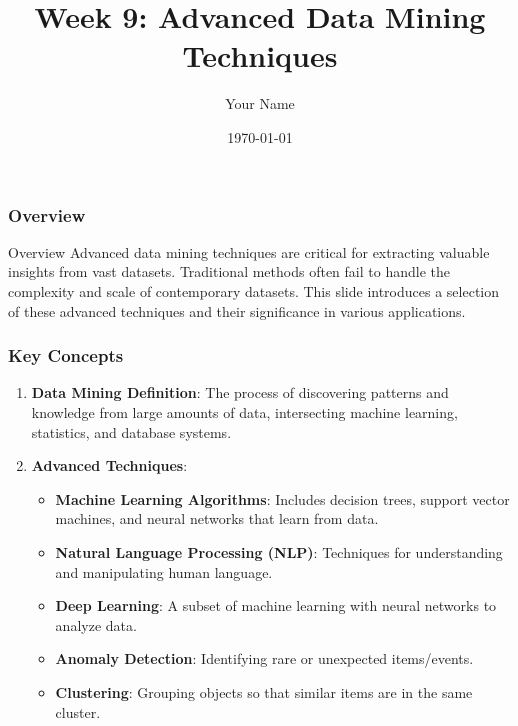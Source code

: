 \documentclass{beamer}
\title{Week 9: Advanced Data Mining Techniques}
\author{Your Name}
\institute{Your Institution}
\date{\today}
\begin{document}
\frame{\titlepage}

\begin{frame}[fragile]
    \titlepage
\end{frame}

\begin{frame}[fragile]
    \frametitle{Overview}
    \begin{block}{Overview}
        Advanced data mining techniques are critical for extracting valuable insights from vast datasets. Traditional methods often fail to handle the complexity and scale of contemporary datasets. This slide introduces a selection of these advanced techniques and their significance in various applications.
    \end{block}
\end{frame}

\begin{frame}[fragile]
    \frametitle{Key Concepts}
    \begin{enumerate}
        \item \textbf{Data Mining Definition}: The process of discovering patterns and knowledge from large amounts of data, intersecting machine learning, statistics, and database systems.
        
        \item \textbf{Advanced Techniques}:
        \begin{itemize}
            \item \textbf{Machine Learning Algorithms}: Includes decision trees, support vector machines, and neural networks that learn from data.
            \item \textbf{Natural Language Processing (NLP)}: Techniques for understanding and manipulating human language.
            \item \textbf{Deep Learning}: A subset of machine learning with neural networks to analyze data.
            \item \textbf{Anomaly Detection}: Identifying rare or unexpected items/events.
            \item \textbf{Clustering}: Grouping objects so that similar items are in the same cluster.
        \end{itemize}
    \end{enumerate}
\end{frame}
\end{document}

